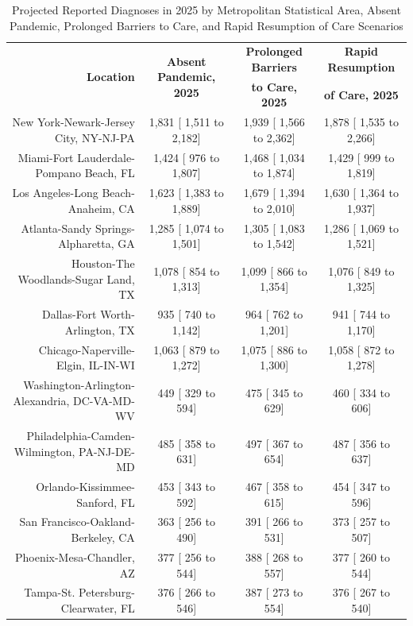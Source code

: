 \documentclass{article}
\begin{document}
\begin{table}[H]
	\caption{Projected Reported Diagnoses in 2025 by Metropolitan Statistical Area, Absent Pandemic, Prolonged Barriers to Care, and Rapid Resumption of Care Scenarios}
	\footnotesize
	\begin{tabular}{|r|c|c|c|}
		\hline
		\multirow{2}{*}{\textbf{Location}} & \multirow{2}{*}{\textbf{Absent Pandemic, 2025}} & \textbf{Prolonged Barriers} & \textbf{Rapid Resumption}\\
		&  & \textbf{to Care, 2025} & \textbf{of Care, 2025}\\
		\hline\hline
		New York-Newark-Jersey City, NY-NJ-PA &  1,831 [ 1,511 to  2,182] &  1,939 [ 1,566 to  2,362] &  1,878 [ 1,535 to  2,266]\\
		Miami-Fort Lauderdale-Pompano Beach, FL &  1,424 [   976 to  1,807] &  1,468 [ 1,034 to  1,874] &  1,429 [   999 to  1,819]\\
		Los Angeles-Long Beach-Anaheim, CA &  1,623 [ 1,383 to  1,889] &  1,679 [ 1,394 to  2,010] &  1,630 [ 1,364 to  1,937]\\
		Atlanta-Sandy Springs-Alpharetta, GA &  1,285 [ 1,074 to  1,501] &  1,305 [ 1,083 to  1,542] &  1,286 [ 1,069 to  1,521]\\
		Houston-The Woodlands-Sugar Land, TX &  1,078 [   854 to  1,313] &  1,099 [   866 to  1,354] &  1,076 [   849 to  1,325]\\
		Dallas-Fort Worth-Arlington, TX &    935 [   740 to  1,142] &    964 [   762 to  1,201] &    941 [   744 to  1,170]\\
		Chicago-Naperville-Elgin, IL-IN-WI &  1,063 [   879 to  1,272] &  1,075 [   886 to  1,300] &  1,058 [   872 to  1,278]\\
		Washington-Arlington-Alexandria, DC-VA-MD-WV &    449 [   329 to    594] &    475 [   345 to    629] &    460 [   334 to    606]\\
		Philadelphia-Camden-Wilmington, PA-NJ-DE-MD &    485 [   358 to    631] &    497 [   367 to    654] &    487 [   356 to    637]\\
		Orlando-Kissimmee-Sanford, FL &    453 [   343 to    592] &    467 [   358 to    615] &    454 [   347 to    596]\\
		San Francisco-Oakland-Berkeley, CA &    363 [   256 to    490] &    391 [   266 to    531] &    373 [   257 to    507]\\
		Phoenix-Mesa-Chandler, AZ &    377 [   256 to    544] &    388 [   268 to    557] &    377 [   260 to    544]\\
		Tampa-St. Petersburg-Clearwater, FL &    376 [   266 to    546] &    387 [   273 to    554] &    376 [   267 to    540]\\

\end{tabular}
\end{table}
\end{document}
